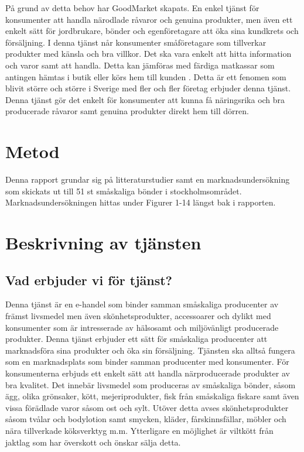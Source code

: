 \documentclass[10pt,a4paper,oneside]{article}
\begin{document}
På grund av detta behov har GoodMarket skapats. En enkel tjänst för konsumenter att handla närodlade råvaror och genuina produkter,  men även ett enkelt sätt för jordbrukare, bönder och egenföretagare att öka sina kundkrets och försäljning. I denna tjänst når konsumenter småföretagare som tillverkar produkter med känsla och bra villkor. Det ska vara enkelt att hitta information och varor samt att handla. Detta kan jämföras med färdiga matkassar som antingen hämtas i butik eller körs hem till kunden \cite{ICA2}. Detta är ett fenomen som blivit större och större i Sverige med fler och fler företag erbjuder denna tjänst. Denna tjänst gör det enkelt för konsumenter att kunna få näringsrika och bra producerade råvaror samt genuina produkter direkt hem till dörren. 

\newpage

\section{Metod}
Denna rapport grundar sig på litteraturstudier samt en marknadsundersökning som skickats ut till 51 st småskaliga bönder i stockholmsområdet. Marknadsundersökningen hittas under Figurer 1-14 längst bak i rapporten.
\newpage

\section{Beskrivning av tjänsten}
\subsection{Vad erbjuder vi för tjänst?}
Denna tjänst är en e-handel som binder samman småskaliga producenter av främst livsmedel men även skönhetsprodukter, accessoarer och dylikt med konsumenter som är intresserade av hälsosamt och miljövänligt producerade produkter. Denna tjänst erbjuder ett sätt för småskaliga producenter att marknadsföra sina produkter och öka sin försäljning. Tjänsten ska alltså fungera som en marknadsplats som binder samman producenter med konsumenter. För konsumenterna erbjuds ett enkelt sätt att handla närproducerade produkter av bra kvalitet. Det innebär livsmedel som produceras av småskaliga bönder, såsom ägg, olika grönsaker, kött, mejeriprodukter, fisk från småskaliga fiskare samt även vissa förädlade varor såsom ost och sylt. Utöver detta avses skönhetsprodukter såsom tvålar och bodylotion samt smycken, kläder, fårskinnsfällar, möbler och nära tillverkade köksverktyg m.m. Ytterligare en möjlighet är viltkött från jaktlag som har överskott och önskar sälja detta. 
\end{document}
